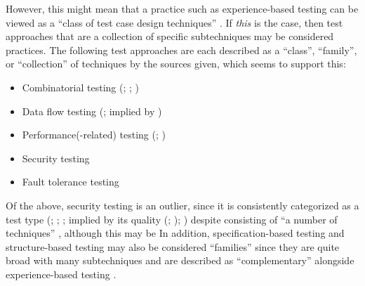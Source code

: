 \ifnotpaper
    \label{classFamilyDiscrep}
    However, this might mean that a practice such as experience-based testing
    can be viewed as a ``class of test case design techniques''
    \citep[p.~4]{IEEE2022}. If \emph{this} is the case, then test approaches
    that are a collection of specific subtechniques may be considered
    practices. The following test approaches are each described as a ``class'',
    ``family'', or ``collection'' of techniques by the sources given, which
    seems to support this:
    \begin{itemize}
        \item Combinatorial testing (\citealp[p.~3]{IEEE2022};
              \citeyear[p.~2]{IEEE2021}; \citealp[p.~5-11]{SWEBOK2024})
        \item Data flow testing (\citeyear[p.~3]{IEEE2021};
              implied by \citealp[p.~5-13]{SWEBOK2024})
        \item Performance(-related) testing (\citealp[p.~38]{IEEE2021};
              \perfAsFamily*{})
        \item Security testing \citep[implied by][p.~40]{IEEE2021}
        \item Fault tolerance testing \citep[implied by][p.~4\=/11]{SWEBOK2024}
    \end{itemize}
    Of the above, security testing is an outlier, since it is consistently
    categorized as a test type (\citealp[pp.~9, 22, 26--27]{IEEE2022};
    \citeyear[pp.~7, 40, Tab.~A.1]{IEEE2021}; \citeyear[p.~405]{IEEE2017}%
    ; implied by its quality (\citealp{ISO_IEC2023a};
    \citealp[p.~13-4]{SWEBOK2024}); \citealp[p.~53]{Firesmith2015}) despite
    consisting of ``a number of techniques'' \cite[p.~40]{IEEE2021}, although
    this may be  In addition, specification-based
    testing and structure-based testing may also be considered ``families''
    since they are quite broad with many subtechniques and are described as
    ``complementary'' alongside experience-based testing
    \citep[p.~8, Fig.~2]{IEEE2021}.
\fi


